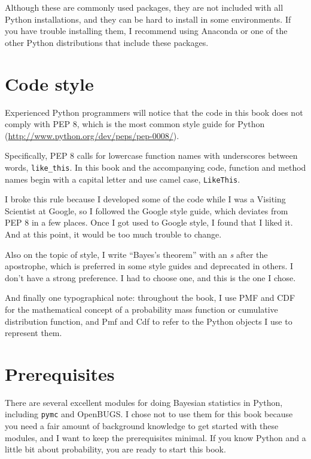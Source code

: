 \documentclass[12pt]{book}
\theoremstyle{exercise}
\newcommand{\py}[1]{{\tt #1}}%
\begin{document}
Although these are commonly used packages, they are not included with
all Python installations, and they can be hard to install in some
environments.  If you have trouble installing them, I
recommend using Anaconda or one of the other Python distributions
that include these packages.



\section{Code style}

Experienced Python programmers will notice that the code in this
book does not comply with PEP 8, which is the most common
style guide for Python (\url{http://www.python.org/dev/peps/pep-0008/}).

Specifically, PEP 8 calls for lowercase function names with
underscores between words, \verb"like_this".  In this book and
the accompanying code, function and method names begin with
a capital letter and use camel case, \verb"LikeThis".

I broke this rule because I developed some of the code
while I was a Visiting Scientist at Google, so I followed
the Google style guide, which deviates from PEP 8 in a few
places.  Once I got used to Google style, I found that I liked
it.  And at this point, it would be too much trouble to change.

Also on the topic of style, I write ``Bayes's theorem''
with an {\it s} after the apostrophe, which is preferred in some
style guides and deprecated in others.  I don't have a strong
preference.  I had to choose one, and this is the one I chose.

And finally one typographical note: throughout the book, I use
PMF and CDF for the mathematical concept of a probability
mass function or cumulative distribution function, and Pmf and Cdf
to refer to the Python objects I use to represent them.


\section{Prerequisites}

There are several excellent modules for doing Bayesian statistics in
Python, including \py{pymc} and OpenBUGS.  I chose not to use them
for this book because you need a fair amount of background knowledge
to get started with these modules, and I want to keep the
prerequisites minimal.  If you know Python and a little bit about
probability, you are ready to start this book.
\end{document}
